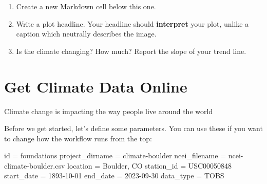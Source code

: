\documentclass[
  letterpaper,
  DIV=11,
  numbers=noendperiod,
  oneside]{scrreprt}
\newenvironment{Shaded}{\begin{snugshade}}{\end{snugshade}}
\newcommand{\BuiltInTok}[1]{\textcolor[rgb]{0.00,0.23,0.31}{#1}}
\newcommand{\NormalTok}[1]{\textcolor[rgb]{0.00,0.23,0.31}{#1}}
\newcommand{\OperatorTok}[1]{\textcolor[rgb]{0.37,0.37,0.37}{#1}}
\newcommand{\StringTok}[1]{\textcolor[rgb]{0.13,0.47,0.30}{#1}}
\begin{document}
\begin{tcolorbox}[enhanced jigsaw, colbacktitle=quarto-callout-color!10!white, opacityback=0, bottomtitle=1mm, toptitle=1mm, bottomrule=.15mm, left=2mm, colframe=quarto-callout-color-frame, leftrule=.75mm, opacitybacktitle=0.6, colback=white, rightrule=.15mm, toprule=.15mm, breakable, titlerule=0mm, title=\textcolor{quarto-callout-color}{\faInfo}\hspace{0.5em}{Reflect and Respond: Interpret the trend}, coltitle=black, arc=.35mm]

\begin{enumerate}
\def\labelenumi{\arabic{enumi}.}
\item
  Create a new Markdown cell below this one.
\item
  Write a plot headline. Your headline should \textbf{interpret} your
  plot, unlike a caption which neutrally describes the image.
\item
  Is the climate changing? How much? Report the slope of your trend
  line.
\end{enumerate}

\end{tcolorbox}


\chapter{Get Climate Data Online}\label{get-climate-data-online-1}

Climate change is impacting the way people live around the world

\hfill\break

Before we get started, let's define some parameters. You can use these
if you want to change how the workflow runs from the top:

\begin{Shaded}
\begin{Highlighting}[]
\BuiltInTok{id} \OperatorTok{=} \StringTok{\textquotesingle{}foundations\textquotesingle{}}
\NormalTok{project\_dirname }\OperatorTok{=} \StringTok{\textquotesingle{}climate{-}boulder\textquotesingle{}}
\NormalTok{ncei\_filename }\OperatorTok{=} \StringTok{\textquotesingle{}ncei{-}climate{-}boulder.csv\textquotesingle{}}
\NormalTok{location }\OperatorTok{=} \StringTok{\textquotesingle{}Boulder, CO\textquotesingle{}}
\NormalTok{station\_id }\OperatorTok{=} \StringTok{\textquotesingle{}USC00050848\textquotesingle{}}
\NormalTok{start\_date }\OperatorTok{=} \StringTok{\textquotesingle{}1893{-}10{-}01\textquotesingle{}}
\NormalTok{end\_date }\OperatorTok{=} \StringTok{\textquotesingle{}2023{-}09{-}30\textquotesingle{}}
\NormalTok{data\_type }\OperatorTok{=} \StringTok{\textquotesingle{}TOBS\textquotesingle{}}
\end{Highlighting}
\end{Shaded}
\end{document}
